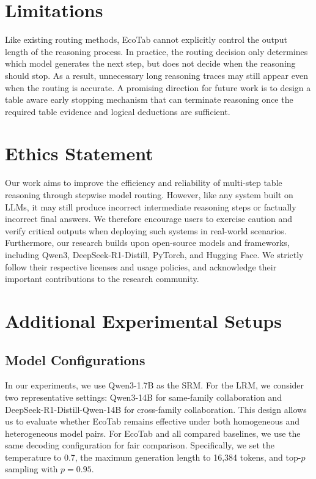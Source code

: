 \documentclass[11pt]{article}
\begin{document}
\section*{Limitations}
Like existing routing methods, EcoTab cannot explicitly control the output length of the reasoning process. In practice, the routing decision only determines which model generates the next step, but does not decide when the reasoning should stop. As a result, unnecessary long reasoning traces may still appear even when the routing is accurate. A promising direction for future work is to design a table aware early stopping mechanism that can terminate reasoning once the required table evidence and logical deductions are sufficient.

\vspace{-4pt}

\section*{Ethics Statement}

Our work aims to improve the efficiency and reliability of multi-step table reasoning through stepwise model routing. However, like any system built on LLMs, it may still produce incorrect intermediate reasoning steps or factually incorrect final answers. We therefore encourage users to exercise caution and verify critical outputs when deploying such systems in real-world scenarios. Furthermore, our research builds upon open-source models and frameworks, including Qwen3, DeepSeek-R1-Distill, PyTorch, and Hugging Face. We strictly follow their respective licenses and usage policies, and acknowledge their important contributions to the research community.

\vspace{-8pt}



\appendix

\section{Additional Experimental Setups}
\label{sec:appendix1}

\subsection{Model Configurations}
\label{sec:a1}
In our experiments, we use Qwen3-1.7B \citep{yang2025qwen3} as the SRM. For the LRM, we consider two representative settings: Qwen3-14B \citep{yang2025qwen3} for same-family collaboration and DeepSeek-R1-Distill-Qwen-14B \citep{guo2025deepseek} for cross-family collaboration. This design allows us to evaluate whether EcoTab remains effective under both homogeneous and heterogeneous model pairs.
For EcoTab and all compared baselines, we use the same decoding configuration for fair comparison. Specifically, we set the temperature to 0.7, the maximum generation length to 16{,}384 tokens, and top-$p$ sampling with $p=0.95$.
\end{document}
